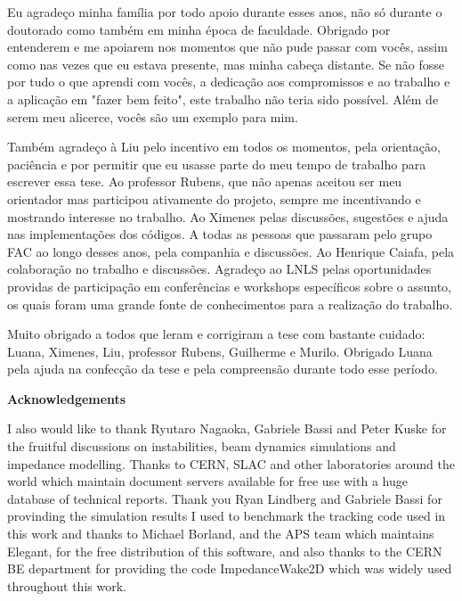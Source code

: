 \begin{agradecimentos}[Agradecimentos]
    Eu agradeço minha família por todo apoio durante esses anos, não só durante o doutorado como também em minha época de faculdade. Obrigado por entenderem e me apoiarem nos momentos que não pude passar com vocês, assim como nas vezes que eu estava presente, mas minha cabeça distante. Se não fosse por tudo o que aprendi com vocês, a dedicação aos compromissos e ao trabalho e a aplicação em "fazer bem feito", este trabalho não teria sido possível. Além de serem meu alicerce, vocês são um exemplo para mim.

    Também agradeço à Liu pelo incentivo em todos os momentos, pela orientação, paciência e por permitir que eu usasse parte do meu tempo de trabalho para escrever essa tese. Ao professor Rubens, que não apenas aceitou ser meu orientador mas participou ativamente do projeto, sempre me incentivando e mostrando interesse no trabalho. Ao Ximenes pelas discussões, sugestões e ajuda nas implementações dos códigos. A todas as pessoas que passaram pelo grupo FAC ao longo desses anos, pela companhia e discussões. Ao Henrique Caiafa, pela colaboração no trabalho e discussões. Agradeço ao LNLS pelas oportunidades providas de participação em conferências e workshops específicos sobre o assunto, os quais foram uma grande fonte de conhecimentos para a realização do trabalho.

    Muito obrigado a todos que leram e corrigiram a tese com bastante cuidado: Luana, Ximenes, Liu, professor Rubens, Guilherme e Murilo. Obrigado Luana pela ajuda na confecção da tese e pela compreensão durante todo esse período.

    \vspace{5mm}
    {\centering \Large \textbf{Acknowledgements}}

    I also would like to thank Ryutaro Nagaoka, Gabriele Bassi and Peter Kuske for the fruitful discussions on instabilities, beam dynamics simulations and impedance modelling. Thanks to CERN, SLAC and other laboratories around the world which maintain document servers available for free use with a huge database of technical reports. Thank you Ryan Lindberg and Gabriele Bassi for provinding the simulation results I used to benchmark the tracking code used in this work and thanks to Michael Borland, and the APS team which maintains Elegant, for the free distribution of this software, and also thanks to the CERN BE department for providing the code ImpedanceWake2D which was widely used throughout this work.
\end{agradecimentos}

